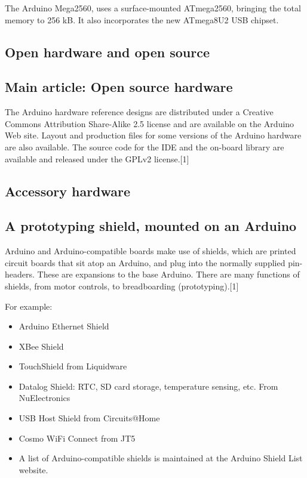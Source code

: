 The Arduino Mega2560, uses a surface-mounted ATmega2560, bringing the total memory to 256 kB. It also incorporates the new ATmega8U2 USB chipset.

\subsection{Open hardware and open source}

\subsection{Main article: Open source hardware}

The Arduino hardware reference designs are distributed under a Creative Commons Attribution Share-Alike 2.5 license and are available on the Arduino Web site. Layout and production files for some versions of the Arduino hardware are also available. The source code for the IDE and the on-board library are available and released under the GPLv2 license.[1]

\subsection{Accessory hardware}


\subsection{A prototyping shield, mounted on an Arduino}

Arduino and Arduino-compatible boards make use of shields, which are printed circuit boards that sit atop an Arduino, and plug into the normally supplied pin-headers. These are expansions to the base Arduino. There are many functions of shields, from motor controls, to breadboarding (prototyping).[1]

For example:

\begin{itemize}
\item Arduino Ethernet Shield
\item XBee Shield
\item TouchShield from Liquidware
\item Datalog Shield: RTC, SD card storage, temperature sensing, etc. From NuElectronics
\item USB Host Shield from Circuits@Home
\item Cosmo WiFi Connect from JT5
\item A list of Arduino-compatible shields is maintained at the Arduino Shield List website.
\end{itemize}


